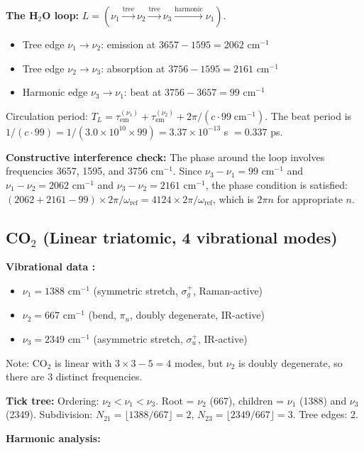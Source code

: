 \documentclass[11pt,a4paper]{article}
\theoremstyle{definition}
\theoremstyle{remark}
\newcommand{\tem}{\tau_{\mathrm{em}}}
\begin{document}
\textbf{The H$_2$O loop:} $L = (\nu_1 \xrightarrow{\text{tree}} \nu_2 \xrightarrow{\text{tree}} \nu_3 \xrightarrow{\text{harmonic}} \nu_1)$.
\begin{itemize}[nosep]
\item Tree edge $\nu_1 \to \nu_2$: emission at $3657 - 1595 = 2062$ cm$^{-1}$
\item Tree edge $\nu_2 \to \nu_3$: absorption at $3756 - 1595 = 2161$ cm$^{-1}$
\item Harmonic edge $\nu_3 \to \nu_1$: beat at $3756 - 3657 = 99$ cm$^{-1}$
\end{itemize}

Circulation period: $T_L = \tem^{(\nu_1)} + \tem^{(\nu_2)} + 2\pi/(c \cdot 99 \;\text{cm}^{-1})$. The beat period is $1/(c \cdot 99) = 1/(3.0 \times 10^{10} \times 99) = 3.37 \times 10^{-13}$ s $= 0.337$ ps.

\textbf{Constructive interference check:} The phase around the loop involves frequencies 3657, 1595, and 3756 cm$^{-1}$. Since $\nu_3 - \nu_1 = 99$ cm$^{-1}$ and $\nu_1 - \nu_2 = 2062$ cm$^{-1}$ and $\nu_3 - \nu_2 = 2161$ cm$^{-1}$, the phase condition is satisfied: $(2062 + 2161 - 99) \times 2\pi/\omega_{\mathrm{ref}} = 4124 \times 2\pi/\omega_{\mathrm{ref}}$, which is $2\pi n$ for appropriate $n$.

\subsection{CO$_2$ (Linear triatomic, 4 vibrational modes)}

\textbf{Vibrational data \citep{shimanouchi1972, nist_webbook}:}
\begin{itemize}[nosep]
\item $\nu_1 = 1388$ cm$^{-1}$ (symmetric stretch, $\sigma_g^+$, Raman-active)
\item $\nu_2 = 667$ cm$^{-1}$ (bend, $\pi_u$, doubly degenerate, IR-active)
\item $\nu_3 = 2349$ cm$^{-1}$ (asymmetric stretch, $\sigma_u^+$, IR-active)
\end{itemize}
Note: CO$_2$ is linear with $3 \times 3 - 5 = 4$ modes, but $\nu_2$ is doubly degenerate, so there are 3 distinct frequencies.

\textbf{Tick tree:} Ordering: $\nu_2 < \nu_1 < \nu_3$. Root = $\nu_2$ (667), children = $\nu_1$ (1388) and $\nu_3$ (2349). Subdivision: $N_{21} = \lfloor 1388/667 \rfloor = 2$, $N_{23} = \lfloor 2349/667 \rfloor = 3$. Tree edges: 2.

\textbf{Harmonic analysis:}
\end{document}
